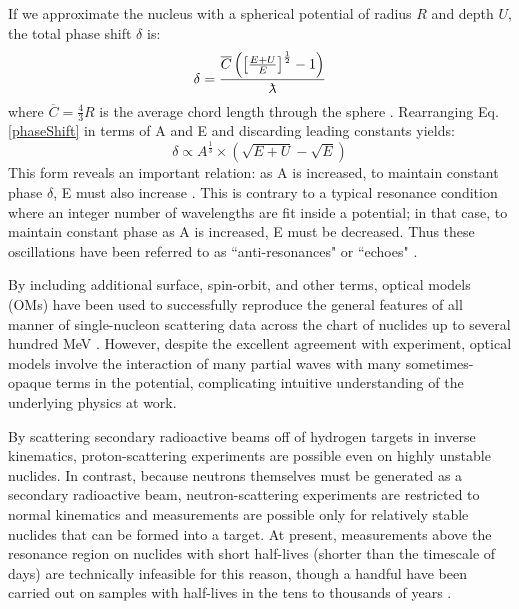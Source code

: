If we approximate the nucleus with a
spherical potential of radius $R$ and depth $U$, the total phase shift $\delta$ is:
\begin{equation} \label{phaseShift}
    \delta =
    \frac{\overline{C}\left(\left[{\frac{E+U}{E}}\right]^{\frac{1}{2}}-1\right)}{\lambdabar}
\end{equation}
where $\overline{C} = \frac{4}{3}R$ is the average chord length through the
sphere \cite{Angeli1970}. Rearranging Eq. \ref{phaseShift} in terms of A and E and
discarding leading constants yields:
\begin{equation}
    \delta \propto A^{\frac{1}{3}}\times\left(\sqrt{E+U}-\sqrt{E}\right)
\end{equation}
This form reveals an important relation: as A is increased, to maintain constant 
phase $\delta$, E must also increase \cite{Satchler1980, Peterson1962}. 
This is contrary to a typical resonance condition where an integer number of wavelengths
are fit inside a potential; in that case, to maintain constant phase as A is increased,
E must be decreased. Thus these \tots oscillations have been referred to as
``anti-resonances" or ``echoes" \cite{Satchler1980, McVoy1967}.

By including additional surface, spin-orbit, and other terms, optical models (OMs) have been 
used to successfully reproduce the general features of all manner of single-nucleon scattering 
data across the chart of nuclides up to several hundred MeV \cite{CH89}. 
However, despite the excellent agreement with experiment, optical models
involve the interaction of many partial waves with many sometimes-opaque terms
in the potential, complicating intuitive understanding of the underlying
physics at work.

By scattering secondary radioactive beams off of hydrogen targets in inverse
kinematics, proton-scattering experiments are possible even on highly unstable
nuclides. In contrast, because neutrons themselves must be generated as a
secondary radioactive beam, neutron-scattering experiments are restricted to
normal kinematics and \tots measurements are possible only for relatively stable
nuclides that can be formed into a target. At present, \tots measurements above
the resonance region on nuclides with short half-lives (shorter than the timescale of
days) are technically infeasible for this reason, though a handful have been carried out on
samples with half-lives in the tens to thousands of years \cite{Poenitz1983,
Phillips1980, Foster1971}.

